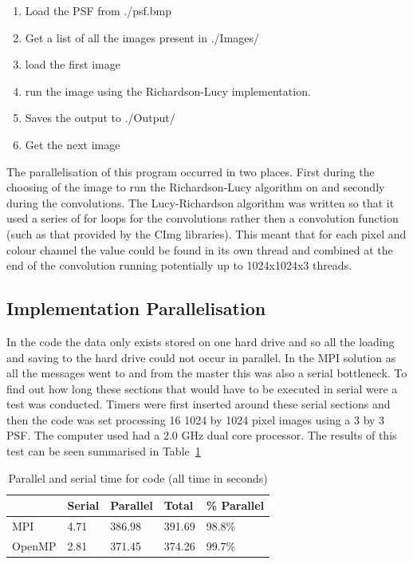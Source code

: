 \begin{enumerate}
	\item Load the PSF from ./psf.bmp
	\item Get a list of all the images present in ./Images/
	\item load the first image
	\item run the image using the Richardson-Lucy implementation.
	\item Saves the output to ./Output/
	\item Get the next image
\end{enumerate}

The parallelisation of this program occurred in two places. First during the choosing of the image to run the Richardson-Lucy algorithm on and secondly during the convolutions. The Lucy-Richardson algorithm was written so that it used a series of for loops for the convolutions rather then a convolution function (such as that provided by the CImg libraries). This meant that for each pixel and colour channel the value could be found in its own thread and combined at the end of the convolution running potentially up to 1024x1024x3 threads.

\subsection*{Implementation Parallelisation}

In the code the data only exists stored on one hard drive and so all the loading and saving to the hard drive could not occur in parallel. In the MPI solution as all the messages went to and from the master this was also a serial bottleneck. To find out how long these sections that would have to be executed in serial were a test was conducted. Timers were first inserted around these serial sections and then the code was set processing 16 1024 by 1024 pixel images using a 3 by 3 PSF. The computer used had a 2.0 GHz dual core processor. The results of this test can be seen summarised in Table~\ref{speed}

\begin{table}[h!]
	\caption{Parallel and serial time for code (all time in seconds)}
	\begin{center}
    	\begin{tabular}{ | l | l | l | l | l |}
    	\hline
    	 & Serial & Parallel & Total & \% Parallel  \\ \hline
		MPI & 4.71 & 386.98 & 391.69 & 98.8\% \\ \hline
		OpenMP & 2.81 & 371.45 & 374.26 & 99.7\% \\ \hline
    	\end{tabular}
	\end{center}
	\label{speed}
\end{table}


